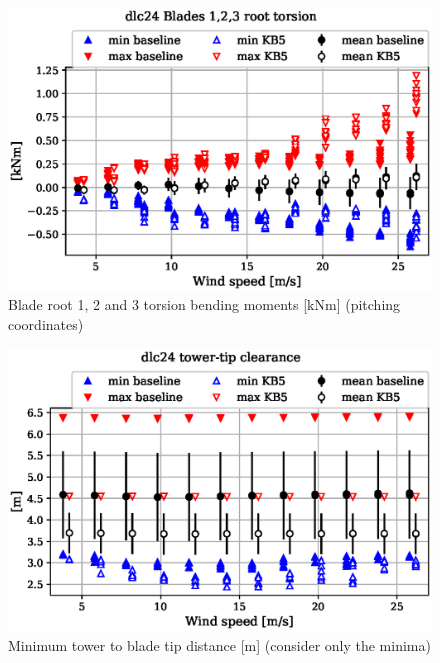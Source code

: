 \begin{figure}[!ht]
\begin{center}
	\includegraphics[width=.85\linewidth]{figures/baseline-vs-KB6/dlc24/blade1-blade1-node-001-momentvec-z_AA0008_AA0008.eps}
\end{center}
\caption{Blade root 1, 2 and 3 torsion bending moments [kNm] (pitching coordinates)}
\label{fig:baseline-vs-KB6:dlc24:blade-root-torsion}
\end{figure}

\begin{figure}[!ht]
\begin{center}
	\includegraphics[width=.85\linewidth]{figures/baseline-vs-KB6/dlc24/DLL-towerclearance_mblade-inpvec-1_AA0008_AA0008.eps}
\end{center}
\caption{Minimum tower to blade tip distance [m] (consider only the minima)}
\label{fig:baseline-vs-KB6:dlc24:tower-tip-clearance}
\end{figure}

